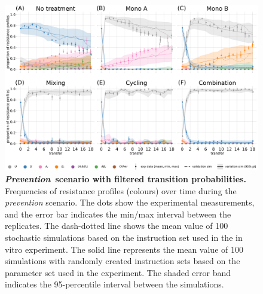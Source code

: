 \clearpage
\begin{figure}[p]
  \centering
  \includegraphics[width=\linewidth]{chapter_2_sup/figures/20210417_timeplot_clean.pdf}
  \caption{\textbf{\textit{Prevention}~scenario with filtered transition probabilities.}
    Frequencies of resistance profiles (colours) over time during the \textit{prevention} scenario.
    The dots show the experimental measurements, and the error bar indicates the min/max interval between the replicates.
    The dash-dotted line shows the mean value of 100 stochastic simulations based on the instruction set used in the in vitro experiment.
    The solid line represents the mean value of 100 simulations with randomly created instruction sets based on the parameter set used in the experiment.
  The shaded error band indicates the 95-percentile interval between the simulations.}
  \label{fig:exp1_filtered}
\end{figure}

